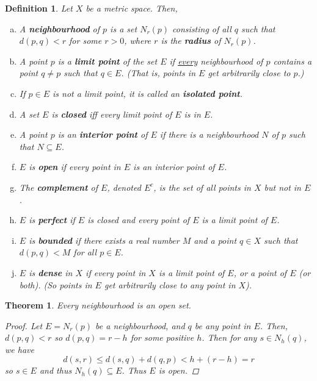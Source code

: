 \documentclass{scrbook}
\renewcommand{\underline}{\ul}
\newtheorem{theorem}{Theorem}
\newtheorem{definition}{Definition}
\begin{document}
\begin{definition}
Let $X$ be a metric space. Then, 
\begin{enumerate}[(a)]
\item A \textbf{neighbourhood} of $p$ is a set $N_r(p)$ consisting of all $q$ such that $d(p, q) < r$ for some $r > 0$, where $r$ is the \textbf{radius} of $N_r(p)$.

\item A point $p$ is a \textbf{limit point} of the set $E$ if \underline{every} neighbourhood of $p$ contains a point $q \ne p$ such that $q \in E$. (That is, points in $E$ get arbitrarily close to $p$.)

\item If $p \in E$ is not a limit point, it is called an \textbf{isolated point}.

\item A set $E$ is \textbf{closed} iff every limit point of $E$ is in $E$.

\item A point $p$ is an \textbf{interior point} of $E$ if there is a neighbourhood $N$ of $p$ such that $N \subseteq E$.

\item $E$ is \textbf{open} if every point in $E$ is an interior point of $E$.

\item The \textbf{complement} of $E$, denoted $E^c$, is the set of all points in $X$ but not in $E$.

\item $E$ is \textbf{perfect} if $E$ is closed and every point of $E$ is a limit point of $E$.

\item $E$ is \textbf{bounded} if there exists a real number $M$ and a point $q \in X$ such that $d(p, q) < M$ for all $p \in E$.

\item $E$ is \textbf{dense} in $X$ if every point in $X$ is a limit point of $E$, or a point of $E$ (or both). (So points in $E$ get arbitrarily close to any point in $X$).
\end{enumerate}
\end{definition}

\begin{theorem}
Every neighbourhood is an open set.

\begin{proof}
Let $E = N_r(p)$ be a neighbourhood, and $q$ be any point in $E$. Then, $d(p, q) < r$ so $d(p, q) = r - h$ for some positive $h$. Then for any $s \in N_h(q)$, we have
\[
	d(s, r) \le d(s, q) + d(q, p) < h + (r - h) = r
\]
so $s \in E$ and thus $N_h(q) \subseteq E$. Thus $E$ is open.
\end{proof}
\end{theorem}
\end{document}
